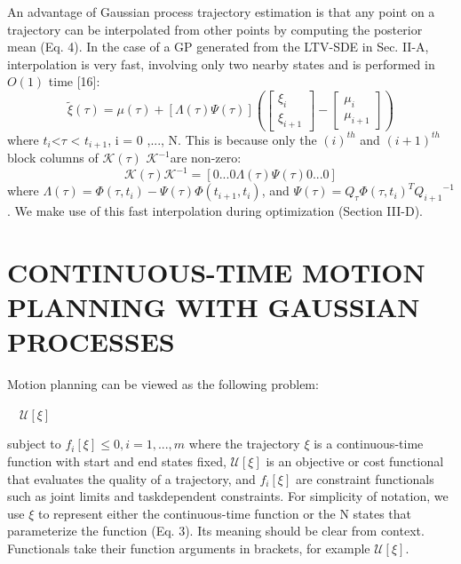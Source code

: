 \documentclass{IEEEtran}
\begin{document}
An advantage of Gaussian process trajectory estimation
is that any point on a trajectory can be interpolated from
other points by computing the posterior mean (Eq. 4). In
the case of a GP generated from the LTV-SDE in Sec. II-A,
interpolation is very fast, involving only two nearby states
and is performed in $\textit{O}(1)$ time [16]:
\begin{equation}
\tilde{\xi}(\tau)=\mu(\tau)+[\Lambda(\tau)\Psi(\tau)]
(\left[
\begin{smallmatrix}{\xi_i}\\{\xi_{i+1}}
\end{smallmatrix}
\right]
-
\left[
\begin{smallmatrix}{\mu_i}\\{\mu_{i+1}}
\end{smallmatrix}
\right])
\tag{15}
\end{equation}
where ${t_i}$<${\tau}$ < ${t_{i+1}}$, i = 0 ,..., N. This is because only the
${(i)^{th}}$ and ${(i+1)^{th}}$ block columns of ${\mathcal{K}(\tau)}$ ${\mathcal{K}^{-1}}$are non-zero:
\begin{equation}
{\mathcal{K}(\tau)}{\mathcal{K}^{-1}}=[0...0{\Lambda(\tau)}{\Psi(\tau)}0...0]\tag{16}
\end{equation}
where ${\Lambda(\tau)}=\Phi(\tau,t_i)-\Psi(\tau)\Phi(t_{i+1},t_i)$, and $\Psi(\tau)=Q_{\tau}{\Phi(\tau,t_i)}^T{Q_{i+1}}^{-1}$ . We make use of this fast interpolation
during optimization (Section III-D).
\section{CONTINUOUS-TIME MOTION PLANNING WITH GAUSSIAN PROCESSES}
Motion planning can be viewed as the following problem:

\hspace*{40pt}$\quad \mathcal{U}[\xi]$

\hspace*{40pt}subject to \quad ${f_i[\xi]}\leq0, i=1,...,m$
where the trajectory $\xi$ is a continuous-time function with
start and end states fixed, $\mathcal{U}[\xi]$ is an objective or cost
functional that evaluates the quality of a trajectory, and
$f_i[{\xi}]$ are constraint functionals such as joint limits and taskdependent constraints. For simplicity of notation, we use $\xi$ to
represent either the continuous-time function or the N states
that parameterize the function (Eq. 3). Its meaning should be
clear from context. Functionals take their function arguments
in brackets, for example $\mathcal{U}[\xi]$.
\end{document}
